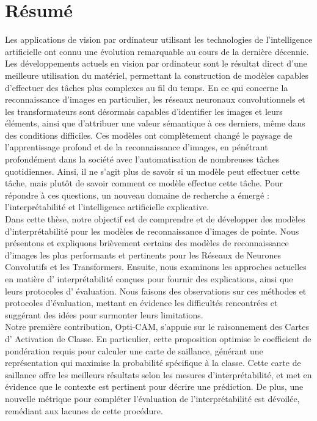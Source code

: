 \chapter*{Résumé}
Les applications de vision par ordinateur utilisant les technologies de l'intelligence artificielle 
ont connu une évolution remarquable au cours de la dernière décennie. Les développements actuels en 
vision par ordinateur sont le résultat direct d'une meilleure utilisation du matériel, permettant 
la construction de modèles capables d'effectuer des tâches plus complexes au fil du temps. En ce 
qui concerne la reconnaissance d'images en particulier, les réseaux neuronaux convolutionnels et 
les transformateurs sont désormais capables d'identifier les images et leurs éléments, ainsi que 
d'attribuer une valeur sémantique à ces derniers, même dans des conditions difficiles. Ces modèles 
ont complètement changé le paysage de l'apprentissage profond et de la reconnaissance d'images, en 
pénétrant profondément dans la société avec l'automatisation de nombreuses tâches quotidiennes. 
Ainsi, il ne s'agit plus de savoir si un modèle peut effectuer cette tâche, mais plutôt de savoir 
comment ce modèle effectue cette tâche. Pour répondre à ces questions, un nouveau domaine de 
recherche a émergé : l'interprétabilité et l'intelligence artificielle explicative.\\

\noindent Dans cette thèse, notre objectif est de comprendre et de développer des modèles 
d'interprétabilité pour les modèles de reconnaissance d'images de pointe. Nous présentons et 
expliquons brièvement certains des modèles de reconnaissance d'images les plus performants et 
pertinents pour les Réseaux de Neurones Convolutifs et les Transformers. Ensuite, nous examinons 
les approches actuelles en matière d' interpr\'etabilit\'e conçues pour fournir des explications, 
ainsi que leurs protocoles d' évaluation. Nous faisons des observations sur ces méthodes et 
protocoles d'évaluation, mettant en évidence les difficultés rencontrées et suggérant des idées 
pour surmonter leurs limitations.\\

\noindent Notre première contribution, Opti-CAM, s'appuie sur le raisonnement des Cartes d' 
Activation de Classe. En particulier, cette proposition optimise le coefficient de pondération 
requis pour calculer une carte de saillance, générant une représentation qui maximise la 
probabilité spécifique à la classe. Cette carte de saillance offre les meilleurs résultats selon 
les mesures d'interprétabilité, et met en évidence que le contexte est pertinent pour décrire une 
prédiction. De plus, une nouvelle métrique pour compléter l'évaluation de l'interprétabilité est 
dévoilée, remédiant aux lacunes de cette procédure.\\

